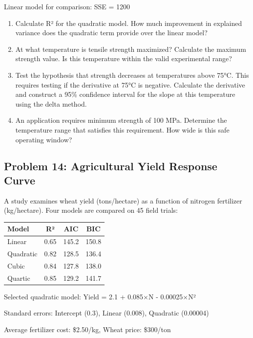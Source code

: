 \documentclass[12pt]{article}
\begin{document}
Linear model for comparison: SSE = 1200

\begin{enumerate}[label=(\alph*)]
\item Calculate R² for the quadratic model. How much improvement in explained variance does the quadratic term provide over the linear model?

\item At what temperature is tensile strength maximized? Calculate the maximum strength value. Is this temperature within the valid experimental range?

\item Test the hypothesis that strength decreases at temperatures above 75°C. This requires testing if the derivative at 75°C is negative. Calculate the derivative and construct a 95\% confidence interval for the slope at this temperature using the delta method.

\item An application requires minimum strength of 100 MPa. Determine the temperature range that satisfies this requirement. How wide is this safe operating window?
\end{enumerate}

\subsection*{Problem 14: Agricultural Yield Response Curve}

A study examines wheat yield (tons/hectare) as a function of nitrogen fertilizer (kg/hectare). Four models are compared on 45 field trials:

\begin{center}
\begin{tabular}{lccc}
\toprule
Model & R² & AIC & BIC \\
\midrule
Linear & 0.65 & 145.2 & 150.8 \\
Quadratic & 0.82 & 128.5 & 136.4 \\
Cubic & 0.84 & 127.8 & 138.0 \\
Quartic & 0.85 & 129.2 & 141.7 \\
\bottomrule
\end{tabular}
\end{center}

Selected quadratic model: Yield = 2.1 + 0.085×N - 0.00025×N²

Standard errors: Intercept (0.3), Linear (0.008), Quadratic (0.00004)

Average fertilizer cost: \$2.50/kg, Wheat price: \$300/ton
\end{document}
